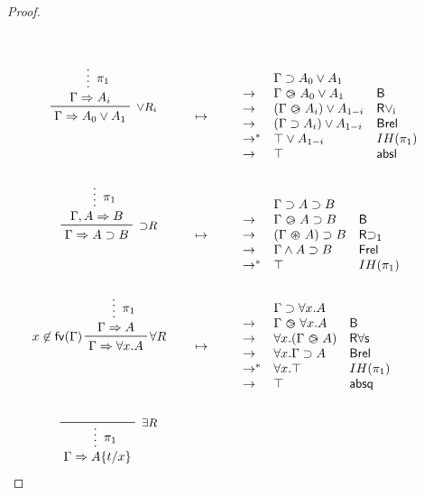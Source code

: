 \begin{proof}
\begin{align*}
\begin{array}{lll}
    \end{array}
    \\\\
    \R[\lor R_i]
      {\summ[$\pi_1$]{\Gamma \seq A_i}}
      {\Gamma \seq A_0 \lor A_1}
    &\mt
    \begin{array}{lll}
            & \Gamma \limp A_0 \lor A_1 & \\
      \step & \Gamma \back A_0 \lor A_1 & \mathsf{B} \\
      \step & (\Gamma \back A_i) \lor A_{1 - i} & \mathsf{R\lor_i} \\
      \step & (\Gamma \limp A_i) \lor A_{1 - i} & \mathsf{Brel} \\
      \steps & \top \lor A_{1 - i} & IH(\pi_1) \\
      \step & \top & \mathsf{absl}
    \end{array}
    \\\\
    \R[{\limp}R]
      {\summ[$\pi_1$]{\Gamma, A \seq B}}
      {\Gamma \seq A \limp B}
    &\mt
    \begin{array}{lll}
            & \Gamma \limp A \limp B & \\
      \step & \Gamma \back A \limp B & \mathsf{B} \\
      \step & (\Gamma \forw A) \limp B & \mathsf{R{\limp}_1} \\
      \step & \Gamma \land A \limp B & \mathsf{Frel} \\
      \steps & \top & IH(\pi_1)
    \end{array}
    \\\\
    \prftree[r][l]{$\forall R$}{$x \not\in \fv(\Gamma)$}
      {\summ[$\pi_1$]{\Gamma \seq A}}
      {\Gamma \seq \forall x. A}
    &\mt
    \begin{array}{lll}
            & \Gamma \limp \forall x. A & \\
      \step & \Gamma \back \forall x. A & \mathsf{B} \\
      \step & \forall x. (\Gamma \back A) & \mathsf{R\forall s} \\
      \step & \forall x. \Gamma \limp A & \mathsf{Brel} \\
      \steps & \forall x. \top & IH(\pi_1) \\
      \step & \top & \mathsf{absq}
    \end{array}
    \\\\
    \R[\exists R]
      {\summ[$\pi_1$]{\Gamma \seq \subst{A}{t}{x}}}

\end{align*}
\end{proof}
